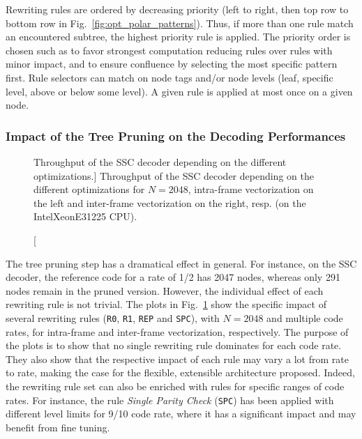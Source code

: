 Rewriting rules are ordered by decreasing priority (left to right, then top row
to bottom row in Fig.~\ref{fig:opt_polar_patterns}). Thus, if more than one rule
match an encountered subtree, the highest priority rule is applied. The priority
order is chosen such as to favor strongest computation reducing rules over rules
with minor impact, and to ensure confluence by selecting the most specific
pattern first. Rule selectors can match on node tags and/or node levels (leaf,
specific level, above or below some level). A given rule is applied at most once
on a given node.

\subsubsection{Impact of the Tree Pruning on the Decoding Performances}

\begin{figure}[htp]
  \centering
  \quad
  \caption
    [Throughput of the SSC decoder depending on the different optimizations.]
    {Throughput of the SSC decoder depending on the different optimizations for
    $N = 2048$, intra-frame vectorization on the left and inter-frame
    vectorization on the right, resp. (on the Intel\R Xeon\TM E31225 CPU).}
  \label{plot:opt_polar_sc_tree_cut}
\end{figure}

The tree pruning step has a dramatical effect in general. For instance, on the
SSC decoder, the reference code for a rate of 1/2 has 2047 nodes, whereas only
291 nodes remain in the pruned version. However, the individual effect of each
rewriting rule is not trivial. The plots in
Fig.~\ref{plot:opt_polar_sc_tree_cut} show the specific impact of several
rewriting rules (\verb|R0|, \verb|R1|, \verb|REP| and \verb|SPC|), with
$N = 2048$ and multiple code rates, for intra-frame and inter-frame
vectorization, respectively. The purpose of the plots is to show that no single
rewriting rule dominates for each code rate. They also show that the respective
impact of each rule may vary a lot from rate to rate, making the case for the
flexible, extensible architecture proposed. Indeed, the rewriting rule set can
also be enriched with rules for specific ranges of code rates. For instance, the
rule \emph{Single Parity Check} (\verb|SPC|) has been applied with different
level limits for 9/10 code rate, where it has a significant impact and may
benefit from fine tuning.

